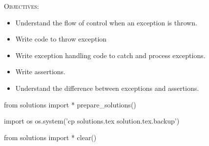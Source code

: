 
\textsc{Objectives:}

\begin{itemize}
\item
  Understand the flow of control when an exception is thrown.
\item
  Write code to throw exception
\item
  Write exception handling code to catch and process exceptions.
\item
  Write assertions.
\item
  Understand the difference between exceptions and assertions.
\end{itemize}











\begin{python0}
from solutions import *
prepare_solutions()
\end{python0}
\begin{python}
import os
os.system('cp solutions.tex solution.tex.backup')  
\end{python}

\begin{python0}
from solutions import *
clear()
\end{python0}

